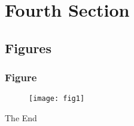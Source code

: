 \documentclass[aspectratio=169]{beamer}
\begin{document}
\section{Fourth Section}

\subsection{Figures}


\begin{frame}
\frametitle{Figure}

\begin{figure}
    \texttt{[image: fig1]}
\end{figure}
\end{frame}


\begin{frame}
\Huge{\centerline{The End}}
\end{frame}

\end{document}
